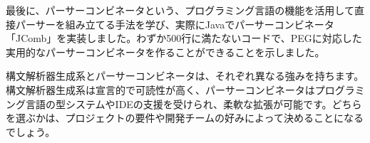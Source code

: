 最後に、パーサーコンビネータという、プログラミング言語の機能を活用して直接パーサーを組み立てる手法を学び、実際にJavaでパーサーコンビネータ「JComb」を実装しました。わずか500行に満たないコードで、PEGに対応した実用的なパーサーコンビネータを作ることができることを示しました。

構文解析器生成系とパーサーコンビネータは、それぞれ異なる強みを持ちます。構文解析器生成系は宣言的で可読性が高く、パーサーコンビネータはプログラミング言語の型システムやIDEの支援を受けられ、柔軟な拡張が可能です。どちらを選ぶかは、プロジェクトの要件や開発チームの好みによって決めることになるでしょう。
